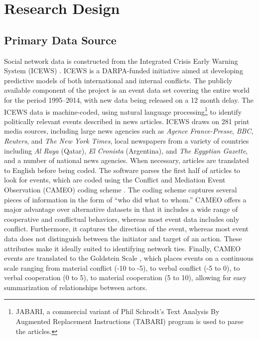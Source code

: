 \section{Research Design}

\subsection{Primary Data Source}

Social network data is constructed from the Integrated Crisis Early Warning System (ICEWS) \citep{Boschee2015,OBrien2010}. ICEWS is a DARPA-funded initiative aimed at developing predictive models of both international and internal conflicts. The publicly available component of the project is an event data set covering the entire world for the period 1995--2014, with new data being released on a 12 month delay. The ICEWS data is machine-coded, using natural language processing\footnote{JABARI, a commercial variant of Phil Schrodt's Text Analysis By Augmented Replacement Instructions (TABARI) program \citep{Schrodt2011} is used to parse the articles.} to identify politically relevant events described in news articles. ICEWS draws on 281 print media sources, including large news agencies such as \textit{Agence France-Presse}, \textit{BBC}, \textit{Reuters}, and \textit{The New York Times}, local newspapers from a variety of countries including \textit{Al Raya} (Qatar), \textit{El Cronista} (Argentina), and \textit{The Egyptian Gazette}, and a number of national news agencies. When necessary, articles are translated to English before being coded. The software parses the first half of articles to look for events, which are coded using the Conflict and Mediation Event Observation (CAMEO) coding scheme \citep{Schrodt2007}. The coding scheme captures several pieces of information in the form of ``who did what to whom.'' CAMEO offers a major advantage over alternative datasets in that it includes a wide range of cooperative and conflictual behaviors, whereas most event data includes only conflict. Furthermore, it captures the direction of the event, whereas most event data does not distinguish between the initiator and target of an action. These attributes make it ideally suited to identifying network ties. Finally, CAMEO events are translated to the Goldstein Scale \citep{Goldstein1992}, which places events on a continuous scale ranging from material conflict (-10 to -5), to verbal conflict (-5 to 0), to verbal cooperation (0 to 5), to material cooperation (5 to 10), allowing for easy summarization of relationships between actors.

